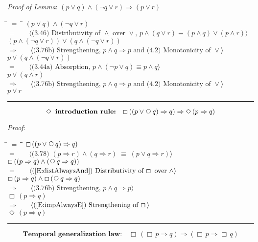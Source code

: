 \documentclass[12pt, fleqn, leqno]{article}
\newcommand{\lgap}{2pt}                             %
\newcommand{\mymathindent}{24pt}                    %
\newcommand{\equivs}{\ensuremath{\;\equiv\;}}       %
\newcommand{\impl}{\ensuremath{\Rightarrow}}        %
\newcommand{\Next}{\;\,\text{\raisebox{3.5pt}{\circle{6}}}}
\newcommand{\Event}{\Diamond\,}
\newcommand{\Always}{\Box\,}
\newcommand{\myqed}{\rule[-.23ex]{1.2ex}{2.0ex}}
\newcommand{\myqedtab}{\hspace{384pt}}              %
\newcommand{\Gll} {\langle}                         %
\newcommand{\Ggg} {\rangle}                         %
\newcommand{\Hint}[1]     {\ \ \ $\Gll              \mbox{#1} \Ggg$ }   %
\begin{document}
\emph{Proof of Lemma}: $(p \lor q) \land (\neg q \lor r)\impl (p\lor r)$
\begin{tabbing}
\hspace{\mymathindent} \= $= \;$ \= \myqedtab \= \kill
  \> \>   $(p\lor q)\land (\neg q\lor r)$\\[\lgap]
  \> $=$  \>  \Hint{(3.46) Distributivity of $\land$ over $\lor$, $p\land(q\lor r) \equiv (p\land q)\lor (p\land r)$}\\[\lgap]
  \> \>   $(p\land (\neg q\lor r))\lor (q\land (\neg q\lor r))$\\[\lgap]
  \> $\impl$  \>  \Hint{(3.76b) Strengthening, $p\land q \impl p$ and (4.2) Monotonicity of $\lor$}\\[\lgap]
  \> \>   $p\lor (q\land (\neg q\lor r))$\\[\lgap]
  \> $=$  \>  \Hint{(3.44a) Absorption, $p\land (\neg p\lor q)\equiv p\land q$}\\[\lgap]
  \> \>   $p\lor (q\land r)$\\[\lgap]
  \> $\impl$  \>  \Hint{(3.76b) Strengthening, $p\land q \impl p$ and (4.2) Monotonicity of $\lor$}\\[\lgap]
  \> \>   $p\lor r$ \quad \myqed
\end{tabbing}

\begin{equation}\label{E:EventIntro}
\textbf{$\Event$ introduction rule:}\quad \Always (( p \lor \Next q) \impl q) \impl \Event (p \impl q)
\end{equation}

\emph{Proof}:
\begin{tabbing}
\hspace{\mymathindent} \= $= \;$ \= \myqedtab \= \kill
  \> \>   $\Always (( p \lor \Next q) \impl q)$\\[\lgap]
   \> $=$ \> \Hint{(3.78) $(p\impl r) \land (q\impl r) \equivs (p\lor q\impl r)$} \\[\lgap]
    \> \>   $\Always (( p \impl q) \land (\Next q \impl q))$\\[\lgap]
   \> $=$  \>  \Hint{(\ref{E:distAlwaysAnd}) Distributivity of $\Always$ over $\land$}\\[\lgap]
   \> \>   $\Always ( p \impl q) \land \Always (\Next q \impl q)$\\[\lgap]
   \> $\impl$  \>  \Hint{(3.76b) Strengthening, $p\land q \impl p$}\\[\lgap]
   \> \>   $\Always ( p \impl q)$\\[\lgap]
    \> $\impl$  \>  \Hint{(\ref{E:impAlwaysE}) Strengthening of $\Always$}\\[\lgap]
    \> \>   $\Event ( p \impl q)$ \quad \myqed
\end{tabbing}
\begin{equation}\label{E:tempGenLaw}
\textbf{Temporal generalization law:}\quad \Always (\Always p \impl q) \impl (\Always p \impl \Always q)
\end{equation}
\end{document}
